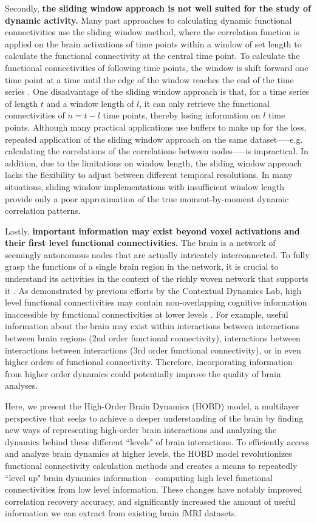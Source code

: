 \documentclass[11pt]{article}
\begin{document}
Secondly, \textbf{the sliding window approach is not well suited for the study of dynamic activity.} Many past approaches to calculating dynamic functional connectivities use the sliding window method, where the correlation function is applied on the brain activations of time points within a window of set length to calculate the functional connectivity at the central time point. To calculate the functional connectivities of following time points, the window is shift forward one time point at a time until the edge of the window reaches the end of the time series \citep{enrico2011}\citep{elena2012}. One disadvantage of the sliding window approach is that, for a time series of length $t$ and a window length of $l$, it can only retrieve the functional connectivities of $n=t-l$ time points, thereby losing information on $l$ time points. Although many practical applications use buffers to make up for the loss, repeated application of the sliding window approach on the same dataset—--e.g. calculating the correlations of the correlations between nodes—--is impractical. In addition, due to the limitations on window length, the sliding window approach lacks the flexibility to adjust between different temporal resolutions. In many situations, sliding window implementations with insufficient window length provide only a poor approximation of the true moment-by-moment dynamic correlation patterns.

Lastly, \textbf{important information may exist beyond voxel activations and their first level functional connectivities.} The brain is a network of seemingly autonomous nodes that are actually intricately interconnected. To fully grasp the functions of a single brain region in the network, it is crucial to understand its activities in the context of the richly woven network that supports it \citep{Battiston2017}. As demonstrated by previous efforts by the Contextual Dynamics Lab, high level functional connectivities may contain non-overlapping cognitive information inaccessible by functional connectivities at lower levels \citep{jeremy2017}. For example, useful information about the brain may exist within interactions between interactions between brain regions (2nd order functional connectivity), interactions between interactions between interactions (3rd order functional connectivity), or in even higher orders of functional connectivity. Therefore, incorporating information from higher order dynamics could potentially improve the quality of brain analyses.

Here, we present the High-Order Brain Dynamics (HOBD) model, a multilayer perspective that seeks to achieve a deeper understanding of the brain by finding new ways of representing high-order brain interactions and analyzing the dynamics behind these different ``levels" of brain interactions. To efficiently access and analyze brain dynamics at higher levels, the HOBD model revolutionizes functional connectivity calculation methods and creates a means to repeatedly ``level up" brain dynamics information---computing high level functional connectivities from low level information. These changes have notably improved correlation recovery accuracy, and significantly increased the amount of useful information we can extract from existing brain fMRI datasets.
\end{document}
